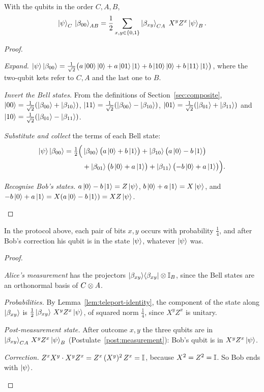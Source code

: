 \begin{lemma}\label{lem:teleport-identity}
  With the qubits in the order $C,A,B$,
  \[
    \left|\psi\right\rangle_C\,\left|\beta_{00}\right\rangle_{AB}=\frac12\sum_{x,y\in\{0,1\}}\left|\beta_{xy}\right\rangle_{CA}\;X^yZ^x\left|\psi\right\rangle_B .
  \]
\end{lemma}
\begin{proof}
  \begin{steps}
    \item \emph{Expand.} $\left|\psi\right\rangle\left|\beta_{00}\right\rangle=\tfrac1{\sqrt2}\bigl(a\left|00\right\rangle\left|0\right\rangle+a\left|01\right\rangle\left|1\right\rangle+b\left|10\right\rangle\left|0\right\rangle+b\left|11\right\rangle\left|1\right\rangle\bigr)$, where the two-qubit kets refer to $C,A$ and the last one to $B$.
    \item \emph{Invert the Bell states.} From the definitions of Section~\ref{sec:composite}, $\left|00\right\rangle=\tfrac1{\sqrt2}(\left|\beta_{00}\right\rangle+\left|\beta_{10}\right\rangle)$, $\left|11\right\rangle=\tfrac1{\sqrt2}(\left|\beta_{00}\right\rangle-\left|\beta_{10}\right\rangle)$, $\left|01\right\rangle=\tfrac1{\sqrt2}(\left|\beta_{01}\right\rangle+\left|\beta_{11}\right\rangle)$ and $\left|10\right\rangle=\tfrac1{\sqrt2}(\left|\beta_{01}\right\rangle-\left|\beta_{11}\right\rangle)$.
    \item \emph{Substitute and collect} the terms of each Bell state:
      \[
        \begin{aligned}
          \left|\psi\right\rangle\left|\beta_{00}\right\rangle=\tfrac12\Bigl(&\left|\beta_{00}\right\rangle\bigl(a\left|0\right\rangle+b\left|1\right\rangle\bigr)+\left|\beta_{10}\right\rangle\bigl(a\left|0\right\rangle-b\left|1\right\rangle\bigr)\\
          &+\left|\beta_{01}\right\rangle\bigl(b\left|0\right\rangle+a\left|1\right\rangle\bigr)+\left|\beta_{11}\right\rangle\bigl(-b\left|0\right\rangle+a\left|1\right\rangle\bigr)\Bigr).
        \end{aligned}
      \]
    \item \emph{Recognise Bob's states.} $a\left|0\right\rangle-b\left|1\right\rangle=Z\left|\psi\right\rangle$, $b\left|0\right\rangle+a\left|1\right\rangle=X\left|\psi\right\rangle$, and $-b\left|0\right\rangle+a\left|1\right\rangle=X(a\left|0\right\rangle-b\left|1\right\rangle)=XZ\left|\psi\right\rangle$. \qedhere
  \end{steps}
\end{proof}

\begin{theorem}[Teleportation]\label{thm:teleportation}
  In the protocol above, each pair of bits $x,y$ occurs with probability $\tfrac14$, and after Bob's correction his qubit is in the state $\left|\psi\right\rangle$, whatever $\left|\psi\right\rangle$ was.
\end{theorem}
\begin{proof}
  \begin{steps}
    \item \emph{Alice's measurement} has the projectors $\left|\beta_{xy}\right\rangle\!\left\langle\beta_{xy}\right|\otimes\mathbb{I}_B$, since the Bell states are an orthonormal basis of $C\otimes A$.
    \item \emph{Probabilities.} By Lemma~\ref{lem:teleport-identity}, the component of the state along $\left|\beta_{xy}\right\rangle$ is $\tfrac12\left|\beta_{xy}\right\rangle\,X^yZ^x\left|\psi\right\rangle$, of squared norm $\tfrac14$, since $X^yZ^x$ is unitary.
    \item \emph{Post-measurement state.} After outcome $x,y$ the three qubits are in $\left|\beta_{xy}\right\rangle_{CA}\,X^yZ^x\left|\psi\right\rangle_B$ (Postulate~\ref{post:measurement}): Bob's qubit is in $X^yZ^x\left|\psi\right\rangle$.
    \item \emph{Correction.} $Z^xX^y\cdot X^yZ^x=Z^x\,(X^y)^2\,Z^x=\mathbb{I}$, because $X^2=Z^2=\mathbb{I}$. So Bob ends with $\left|\psi\right\rangle$. \qedhere
  \end{steps}
\end{proof}

